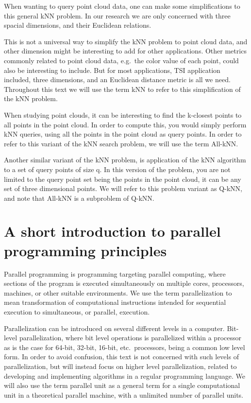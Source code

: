 When wanting to query point cloud data, one can make some simplifications to this general kNN problem. In our research we are only concerned with three spacial dimensions, and their Euclidean relations. 

This is not a universal way to simplify the kNN problem to point cloud data, and other dimension might be interesting to add for other applications. Other metrics commonly related to point cloud data, e.g.\ the color value of each point, could also be interesting to include. But for most applications, TSI application included, three dimensions, and an Euclidean distance metric is all we need. Throughout this text we will use the term kNN to refer to this simplification of the kNN problem.

When studying point clouds, it can be interesting to find the k-closest points to all points in the point cloud. In order to compute this, you would simply perform kNN queries, using all the points in the point cloud as query points. In order to refer to this variant of the kNN search problem, we will use the term All-kNN\@.

Another similar variant of the kNN problem, is application of the kNN algorithm to a set of query points of size q. In this version of the problem, you are not limited to the query point set being the points in the point cloud, it can be any set of three dimensional points. We will refer to this problem variant as Q-kNN, and note that All-kNN is a subproblem of Q-kNN\@.

\section{A short introduction to parallel programming principles} %
\label{sub:a_short_introduction_to_relevant_parallel_programming_principles}

Parallel programming is programming targeting parallel computing, where sections of the program is executed simultaneously on multiple cores, processors, machines, or other suitable environments. We use the term parallelization to mean transformation of computational instructions intended for sequential execution to simultaneous, or parallel, execution.

Parallelization can be introduced on several different levels in a computer. Bit-level parallelization, where bit level operations is parallelized within a processor as is the case for 64-bit, 32-bit, 16-bit, etc.\ processors, being a common low level form. In order to avoid confusion, this text is not concerned with such levels of parallelization, but will instead focus on higher level parallelization, related to developing and implementing algorithms in a regular programming language. We will also use the term parallel unit as a general term for a single computational unit in a theoretical parallel machine, with a unlimited number of parallel units.

